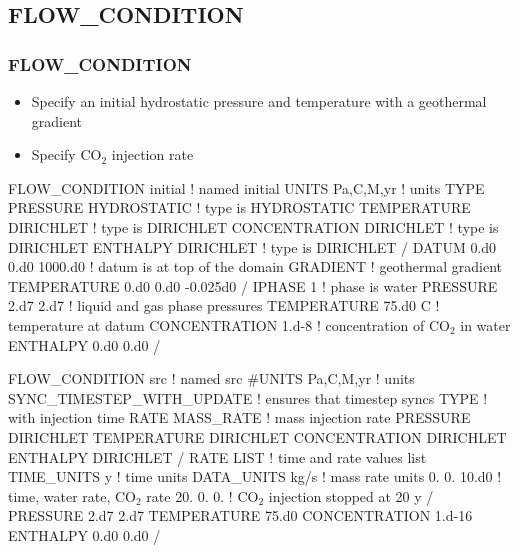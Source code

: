 \documentclass{beamer}
\def\co2{CO$_2$}
\newcommand\redcomment[1]{{{\color{red} #1}}}
\newcommand\bluecomment[1]{{{\color{blue} #1}}}
\newcommand\greencomment[1]{{{\color{green} #1}}}
\begin{document}
\subsection{FLOW\_CONDITION}

\begin{frame}\frametitle{FLOW\_CONDITION}

\begin{itemize}
\item Specify an initial hydrostatic pressure and temperature with a geothermal gradient
\item Specify \co2 injection rate
\end{itemize}

\begin{semiverbatim}
FLOW_CONDITION initial \bluecomment{! named \greencomment{initial}}
  UNITS Pa,C,M,yr \bluecomment{! units}
  TYPE
    PRESSURE HYDROSTATIC    \bluecomment{! type is \redcomment{HYDROSTATIC}}
    TEMPERATURE DIRICHLET   \bluecomment{! type is \redcomment{DIRICHLET}}
    CONCENTRATION DIRICHLET \bluecomment{! type is \redcomment{DIRICHLET}}
    ENTHALPY DIRICHLET      \bluecomment{! type is \redcomment{DIRICHLET}}
  /
  DATUM 0.d0 0.d0 1000.d0 \bluecomment{! datum is at top of the domain}
  GRADIENT                \bluecomment{! geothermal gradient}
    TEMPERATURE 0.d0 0.d0 -0.025d0
  /
  IPHASE 1            \bluecomment{! phase is water}
  PRESSURE 2.d7 2.d7  \bluecomment{! liquid and gas phase pressures}
  TEMPERATURE 75.d0 C \bluecomment{! temperature at datum}
  CONCENTRATION 1.d-8 \bluecomment{! concentration of \co2 in water}
  ENTHALPY 0.d0 0.d0
/

FLOW_CONDITION src  \bluecomment{! named \greencomment{src}}
  #UNITS Pa,C,M,yr \bluecomment{! units}
  SYNC_TIMESTEP_WITH_UPDATE \bluecomment{! ensures that timestep syncs}
  TYPE                      \bluecomment{! with injection time}
    RATE MASS_RATE          \bluecomment{! mass injection rate}
    PRESSURE DIRICHLET
    TEMPERATURE DIRICHLET
    CONCENTRATION DIRICHLET
    ENTHALPY DIRICHLET
  /
  RATE LIST                \bluecomment{! time and rate values list}
    TIME_UNITS y           \bluecomment{! time units}
    DATA_UNITS kg/s        \bluecomment{! mass rate units}
    0.  0. 10.d0           \bluecomment{! time, water rate, \co2 rate}
    20. 0. 0.              \bluecomment{! \co2 injection stopped at 20 y}
  /
  PRESSURE 2.d7 2.d7 
  TEMPERATURE 75.d0
  CONCENTRATION 1.d-16 
  ENTHALPY 0.d0 0.d0
/

\end{semiverbatim}

\end{frame}
\end{document}

